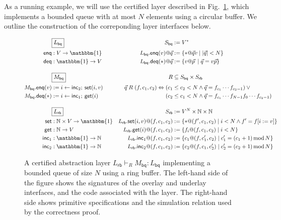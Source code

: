 \documentclass[draft,11pt]{report}
\theoremstyle{definition}
\newcommand{\kw}[1]{\ensuremath{ \mathsf{#1} }}
\begin{document}
As a running example,
we will use the certified layer
described in Fig.~\ref{fig:cal},
which implements a bounded queue with at most $N$ elements
using a circular buffer.
We outline the construction of
the correponding layer interfaces below.

\begin{figure} %
  \small
    \begin{align*}
      & \fbox{$L_\kw{bq}$} &
        S_\kw{bq} &:= V^* \\
      \kw{enq} &: V \rightarrow \mathbbm{1} &
        L_\kw{bq}.\kw{enq}(v)@\vec{q} &:= \{ * @ \vec{q} v \mid |\vec{q}| < N \} \\
      \kw{deq} &: \mathbbm{1} \rightarrow V &
        L_\kw{bq}.\kw{deq}(*)@\vec{q} &:= \{ v @ \vec{p} \: \mid \vec{q} = v \vec{p} \}
      \\[1em]
      & \fbox{$M_\kw{bq}$} &
        R &\subseteq S_\kw{bq} \times S_\kw{rb} \\
      M_\kw{bq}.\kw{enq}(v) &:= i \leftarrow \kw{inc}_2 ; \: \kw{set}(i, v) &
        \vec{q} \mathrel{R} (f, c_1, c_2) \Leftrightarrow
           (c_1 &\le c_2 < N \wedge
            \vec{q} = f_{c_1} \cdots f_{c_2-1}) \vee {}
      \\
      M_\kw{bq}.\kw{deq}(*) &:= i \leftarrow \kw{inc}_1 ; \: \kw{get}(i) &
           (c_2 &\le c_1 < N \wedge
            \vec{q} = f_{c_1} \cdots f_{N-1} f_0 \cdots f_{c_2 - 1})
      \\[1em]
      & \fbox{$L_\kw{rb}$} &
        S_\kw{rb} &:= V^N \times \mathbb{N} \times \mathbb{N}
      \\
      \kw{set} &: \mathbb{N} \times V \rightarrow \mathbbm{1} &
        L_\kw{rb}.\kw{set}(i, v)@(f, c_1, c_2) &:=
        \{ *@(f', c_1, c_2) \mid i < N \wedge f' = f[i := v] \}
      \\
      \kw{get} &: \mathbb{N} \rightarrow V &
        L_\kw{rb}.\kw{get}(i)@(f, c_1, c_2) &:=
        \{ f_i@(f, c_1, c_2) \mid i < N \}
      \\
      \kw{inc}_1 &: \mathbbm{1} \rightarrow \mathbb{N} &
        L_\kw{rb}.\kw{inc}_1@(f, c_1, c_2) &:=
        \{ c_1@(f, c_1', c_2) \mid
           c_1' = (c_1 + 1) \mathop{\mathrm{mod}} N \}
      \\
      \kw{inc}_2 &: \mathbbm{1} \rightarrow \mathbb{N} &
        L_\kw{rb}.\kw{inc}_2@(f, c_1, c_2) &:=
        \{ c_2@(f, c_1, c_2') \mid
           c_2' = (c_2 + 1) \mathop{\mathrm{mod}} N \}
    \end{align*}
  \caption{A certified abstraction layer
    $L_\kw{rb} \vdash_R M_\kw{bq} : L_\kw{bq}$
    implementing a bounded queue of size $N$
    using a ring buffer.
    The left-hand side of the figure shows
    the signatures of the overlay and underlay interfaces,
    and the code associated with the layer.
    The right-hand side shows primitive specifications
    and the simulation relation used by the correctness proof.}
  \label{fig:cal}
\end{figure}
\end{document}
